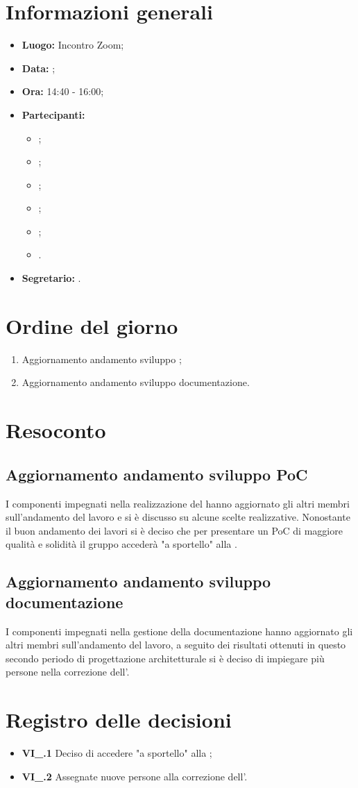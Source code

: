 \section{Informazioni generali}
\begin{itemize}
	\item \textbf{Luogo:} Incontro Zoom;
	\item \textbf{Data:} \Data;
	\item \textbf{Ora:} 14:40 - 16:00;
	\item \textbf{Partecipanti:}
	\begin{itemize}
		\item \BL{}; 
		\item \FF{};
		\item \MM{}; 
		\item \PC{};
		\item \TG{};
		\item \TL{}.
	\end{itemize} 
	\item \textbf{Segretario:} \TG{}.
\end{itemize}

\section{Ordine del giorno}
\begin{enumerate}
	\item Aggiornamento andamento sviluppo ;
	\item Aggiornamento andamento sviluppo documentazione.
\end{enumerate}

\section{Resoconto}
\subsection{Aggiornamento andamento sviluppo PoC}
I componenti impegnati nella realizzazione del  hanno aggiornato gli altri membri sull'andamento del lavoro e si è discusso su alcune scelte realizzative. Nonostante il buon andamento dei lavori si è deciso che per presentare un PoC di maggiore qualità e solidità il gruppo accederà "a sportello" alla .
\subsection{Aggiornamento andamento sviluppo documentazione}
I componenti impegnati nella gestione della documentazione hanno aggiornato gli altri membri sull'andamento del lavoro, a seguito dei risultati ottenuti in questo secondo periodo di progettazione architetturale si è deciso di impiegare più persone nella correzione dell'\AdR{}.

\section{Registro delle decisioni}
\begin{itemize}
	\item \textbf{VI\_\Data.1} Deciso di accedere "a sportello" alla ;
	\item \textbf{VI\_\Data.2} Assegnate nuove persone alla correzione dell'\AdR{}.
\end{itemize}